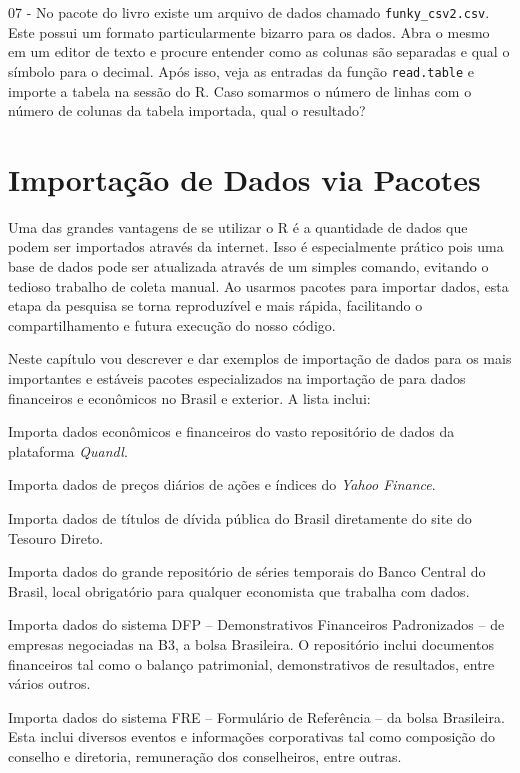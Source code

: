\documentclass[
  11pt,
]{book}
\providecommand{\tightlist}{%
  \setlength{\itemsep}{0pt}\setlength{\parskip}{0pt}}
\begin{document}
07 -
No pacote do livro existe um arquivo de dados chamado \texttt{\textquotesingle{}funky\_csv2.csv\textquotesingle{}}. Este possui um formato particularmente bizarro para os dados. Abra o mesmo em um editor de texto e procure entender como as colunas são separadas e qual o símbolo para o decimal. Após isso, veja as entradas da função \texttt{read.table} e importe a tabela na sessão do R. Caso somarmos o número de linhas com o número de colunas da tabela importada, qual o resultado?

\hypertarget{importacao-pacotes}{%
\chapter{Importação de Dados via Pacotes}\label{importacao-pacotes}}

Uma das grandes vantagens de se utilizar o R é a quantidade de dados que podem ser importados através da internet. Isso é especialmente prático pois uma base de dados pode ser atualizada através de um simples comando, evitando o tedioso trabalho de coleta manual. Ao usarmos pacotes para importar dados, esta etapa da pesquisa se torna reproduzível e mais rápida, facilitando o compartilhamento e futura execução do nosso código.

Neste capítulo vou descrever e dar exemplos de importação de dados para os mais importantes e estáveis pacotes especializados na importação de para dados financeiros e econômicos no Brasil e exterior. A lista inclui:

\begin{description}
\tightlist
\item[\texttt{GetQuandlData} \citep{R-GetQuandlData}]
Importa dados econômicos e financeiros do vasto repositório de dados da plataforma \emph{Quandl}.
\item[\texttt{BatchGetSymbols} \citep{R-BatchGetSymbols}]
Importa dados de preços diários de ações e índices do \emph{Yahoo Finance}.
\item[\texttt{GetTDData} \citep{R-GetTDData}]
Importa dados de títulos de dívida pública do Brasil diretamente do site do Tesouro Direto.
\item[\texttt{GetBCBData} \citep{R-GetBCBData}]
Importa dados do grande repositório de séries temporais do Banco Central do Brasil, local obrigatório para qualquer economista que trabalha com dados.
\item[\texttt{GetDFPData2} \citep{R-GetDFPData2}]
Importa dados do sistema DFP -- Demonstrativos Financeiros Padronizados -- de empresas negociadas na B3, a bolsa Brasileira. O repositório inclui documentos financeiros tal como o balanço patrimonial, demonstrativos de resultados, entre vários outros.
\item[\texttt{GetFREData} \citep{R-GetFREData}]
Importa dados do sistema FRE -- Formulário de Referência -- da bolsa Brasileira. Esta inclui diversos eventos e informações corporativas tal como composição do conselho e diretoria, remuneração dos conselheiros, entre outras.
\end{description}
\end{document}
